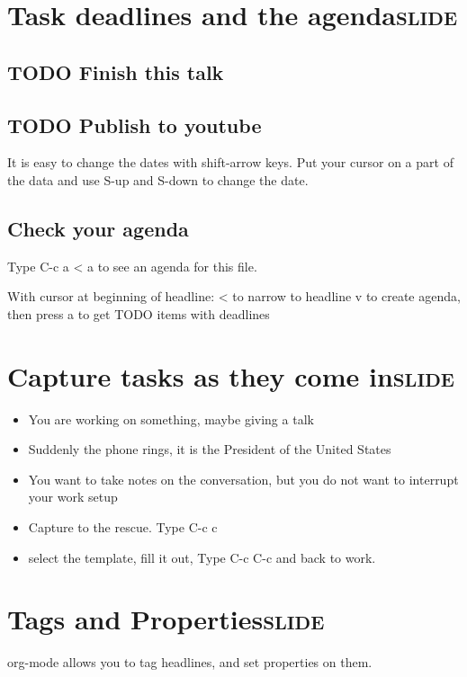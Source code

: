 \documentclass[11pt]{article}
\begin{document}
\section{Task deadlines and the agenda\hfill{}\textsc{slide}}
\label{sec-4}

\subsection{{\bfseries\sffamily TODO} Finish this talk}
\label{sec-4-1}
\subsection{{\bfseries\sffamily TODO} Publish to youtube}
\label{sec-4-2}
It is easy to change the dates with shift-arrow keys. Put your cursor on a part of the data and use S-up and S-down to change the date.

\subsection{Check your agenda}
\label{sec-4-3}

Type C-c a < a to see an agenda for this file.

With cursor at beginning of headline:
< to narrow to headline
v to create agenda, then press a to get TODO items with deadlines
\section{Capture tasks as they come in\hfill{}\textsc{slide}}
\label{sec-5}
\begin{itemize}
\item You are working on something, maybe giving a talk

\item Suddenly the phone rings, it is the President of the United States

\item You want to take notes on the conversation, but you do not want to interrupt your work setup

\item Capture to the rescue. Type C-c c

\item select the template, fill it out, Type C-c C-c and back to work.
\end{itemize}

\section{Tags and Properties\hfill{}\textsc{slide}}
\label{sec-6}
org-mode allows you to tag headlines, and set properties on them.
\end{document}
